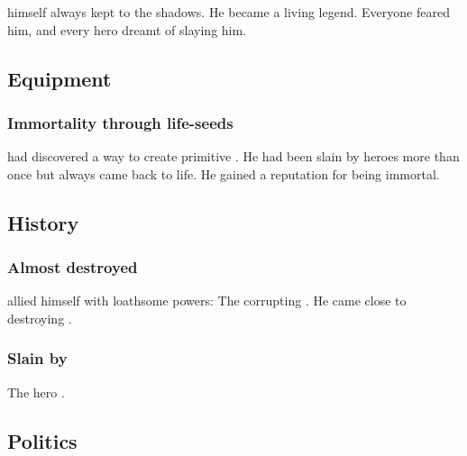 \Sartheron himself always kept to the shadows.
He became a living legend. 
Everyone feared him, and every hero dreamt of slaying him. 





\subsection{Equipment}





\subsubsection{Immortality through life-seeds}
\Sartheron had discovered a way to create primitive . 
He had been slain by heroes more than once but always came back to life.
He gained a reputation for being immortal. 











\subsection{History}





\subsubsection{Almost destroyed \Merkyrah}
\Sartheron allied himself with loathsome powers: The corrupting . 
He came close to destroying \Merkyrah.





\subsubsection{Slain by \Netzach}
The hero \Netzach {}.









\subsection{Politics}

